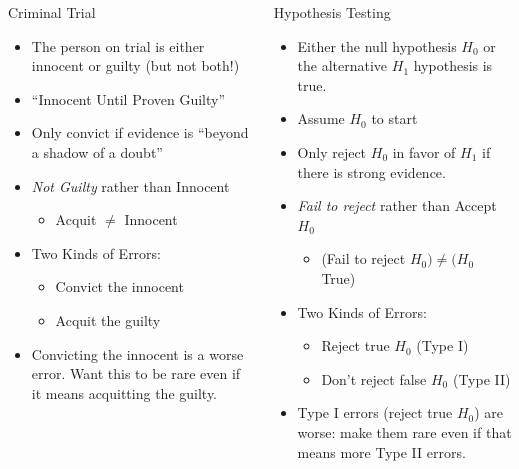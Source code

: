 \documentclass[handout]{beamer}
\begin{document}
\begin{frame}
\footnotesize
\begin{columns}
\begin{column}[l]{6cm} 
   	\begin{block}{Criminal Trial}
	\begin{itemize}
		\item<1-> The person on trial is either innocent or guilty (but not both!)
		\item<2-> ``Innocent Until Proven Guilty''
		\item<3-> Only convict if evidence is ``beyond a shadow of a doubt''
		\item<4-> \emph{Not Guilty} rather than Innocent
			\begin{itemize}\footnotesize
				\item<5-> Acquit $\neq$ Innocent
			\end{itemize}
		\item<6-> Two Kinds of Errors:
			\begin{itemize} \footnotesize
				\item<6-> Convict the innocent
				\item<6->  Acquit the guilty
			\end{itemize}
		\item<7-> Convicting the innocent is a worse error. Want this to be rare even if it means acquitting the guilty.	\end{itemize}
\end{block}
   
   
\end{column} 
\begin{column}[l]{6cm} 


\begin{block}{Hypothesis Testing}
		\begin{itemize}
		\item<1-> Either the null hypothesis $H_0$ or the alternative $H_1$  hypothesis is true.
		\item<2-> Assume $H_0$ to start
		\item<3-> Only reject $H_0$ in favor of $H_1$ if there is strong evidence.
		\item<4-> \emph{Fail to reject} rather than Accept $H_0$	
		\begin{itemize} \footnotesize
			\item<5-> (Fail to reject $H_0) \neq (H_0$ True) 
		\end{itemize}
				\item<6-> Two Kinds of Errors:
			\begin{itemize} \footnotesize
				\item<6-> Reject true $H_0$ (Type I)
				\item<6-> Don't reject false $H_0$ (Type II)
			\end{itemize}
			\item<7-> Type I errors (reject true $H_0$) are worse: make them rare even if that means more Type II errors.
	\end{itemize}
\end{block}


\end{column}
\end{columns}
\end{frame}
\end{document}
